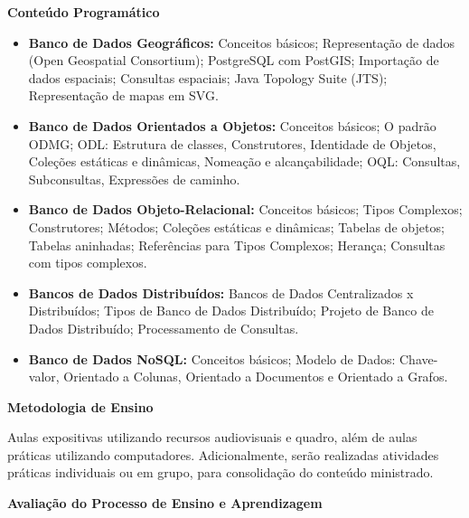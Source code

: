 \begin{snugshade}\begin{center}\textbf{
    Conteúdo Programático
}\end{center}\end{snugshade}

\begin{itemize}

 \item \textbf{Banco de Dados Geográficos:} Conceitos básicos;	Representação de dados (Open Geospatial Consortium); PostgreSQL com PostGIS; Importação de dados espaciais; Consultas espaciais; Java Topology Suite (JTS); Representação de mapas em SVG.
 
 \item \textbf{Banco de Dados Orientados a Objetos:} Conceitos básicos; O padrão ODMG; ODL: Estrutura de classes, Construtores, Identidade de Objetos, Coleções estáticas e dinâmicas, Nomeação e alcançabilidade; OQL: Consultas, Subconsultas, Expressões de caminho.

 \item \textbf{Banco de Dados Objeto-Relacional:} Conceitos básicos; Tipos Complexos; Construtores;	Métodos; Coleções estáticas e dinâmicas; Tabelas de objetos; Tabelas aninhadas; Referências para Tipos Complexos; Herança; Consultas com tipos complexos.
 
 \item \textbf{Bancos de Dados Distribuídos:} Bancos de Dados Centralizados x Distribuídos; Tipos de Banco de Dados Distribuído; Projeto de Banco de Dados Distribuído; Processamento de Consultas.

\item \textbf{Banco de Dados NoSQL:} Conceitos básicos; Modelo de Dados: Chave-valor, Orientado a Colunas, Orientado a Documentos e Orientado a Grafos.

\end{itemize}

\begin{snugshade}\begin{center}\textbf{
    Metodologia de Ensino
}\end{center}\end{snugshade} 

\noindent
   Aulas expositivas utilizando recursos audiovisuais e quadro, além de aulas práticas utilizando computadores. Adicionalmente, serão realizadas atividades práticas individuais ou em grupo, para consolidação do conteúdo ministrado.

\begin{snugshade}\begin{center}\textbf{
    Avaliação do Processo de Ensino e Aprendizagem
}\end{center}\end{snugshade}   

